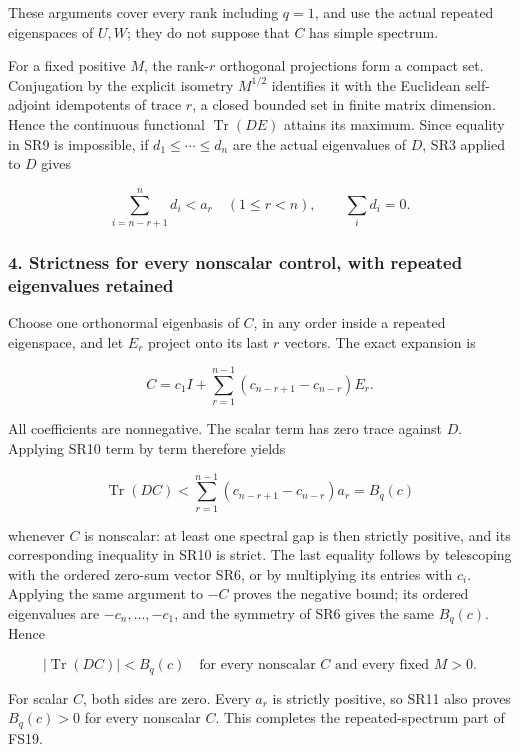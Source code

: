 These arguments cover every rank including \(q=1\), and use the actual repeated eigenspaces of \(U,W\); they do not suppose that \(C\) has simple spectrum.

For a fixed positive \(M\), the rank-\(r\) orthogonal projections form a compact set. Conjugation by the explicit isometry \(M^{1/2}\) identifies it with the Euclidean self-adjoint idempotents of trace \(r\), a closed bounded set in finite matrix dimension. Hence the continuous functional \(\operatorname{Tr}(DE)\) attains its maximum. Since equality in SR9 is impossible, if \(d_1\le\cdots\le d_n\) are the actual eigenvalues of \(D\), SR3 applied to \(D\) gives

\[
\sum_{i=n-r+1}^{n}d_i<a_r\quad(1\le r<n),
\qquad \sum_i d_i=0.
\tag{SR10}
\]

\subsubsection{4. Strictness for every nonscalar control, with repeated eigenvalues retained}\label{endpoint-four_window_sharpness_review--strictness-for-every-nonscalar-control-with-repeated-eigenvalues-retained}

Choose one orthonormal eigenbasis of \(C\), in any order inside a repeated eigenspace, and let \(E_r\) project onto its last \(r\) vectors. The exact expansion is

\[
C=c_1I+\sum_{r=1}^{n-1}
(c_{n-r+1}-c_{n-r})E_r.
\tag{SR11}
\]

All coefficients are nonnegative. The scalar term has zero trace against \(D\). Applying SR10 term by term therefore yields

\[
\operatorname{Tr}(DC)
<\sum_{r=1}^{n-1}(c_{n-r+1}-c_{n-r})a_r=B_q(c)
\tag{SR12}
\]

whenever \(C\) is nonscalar: at least one spectral gap is then strictly positive, and its corresponding inequality in SR10 is strict. The last equality follows by telescoping with the ordered zero-sum vector SR6, or by multiplying its entries with \(c_i\). Applying the same argument to \(-C\) proves the negative bound; its ordered eigenvalues are \(-c_n,\ldots,-c_1\), and the symmetry of SR6 gives the same \(B_q(c)\). Hence

\[
|\operatorname{Tr}(DC)|<B_q(c)
\quad\text{for every nonscalar \(C\) and every fixed \(M>0\)}.
\tag{SR13}
\]

For scalar \(C\), both sides are zero. Every \(a_r\) is strictly positive, so SR11 also proves \(B_q(c)>0\) for every nonscalar \(C\). This completes the repeated-spectrum part of FS19.

